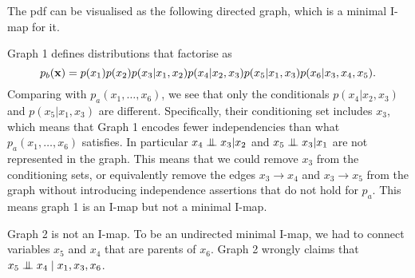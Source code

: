   \begin{solution}
    The pdf can be visualised as the following directed graph, which is a minimal I-map for it.\\
    \begin{center}
    \end{center}
    Graph 1 defines distributions that factorise as
    \begin{equation}
      p_b(\mathbf{x}) = p(x_1) p(x_2) p(x_3|x_1, x_2) p(x_4|x_2, x_3) p(x_5|x_1, x_3) p(x_6|x_3,x_4,x_5).
    \end{equation}
    Comparing with $p_a(x_1, \ldots, x_6)$, we see that only the
    conditionals $p(x_4|x_2, x_3)$ and $p(x_5|x_1, x_3)$ are
    different. Specifically, their conditioning set includes $x_3$,
    which means that Graph 1 encodes fewer independencies than what
    $p_a(x_1, \ldots, x_6)$ satisfies. In particular $x_4 \mathrel{\perp\mspace{-10mu}\perp}
    x_3 | x_2$ and $x_5 \mathrel{\perp\mspace{-10mu}\perp} x_3 | x_1$ are not represented in
    the graph. This means that we could remove $x_3$ from the
    conditioning sets, or equivalently remove the edges $x_3
    \rightarrow x_4$ and $x_3 \rightarrow x_5$ from the graph without
    introducing independence assertions that do not hold for
    $p_a$. This means graph 1 is an I-map but not a minimal I-map.
    
    Graph 2 is not an I-map. To be an undirected minimal I-map, we had
    to connect variables $x_5$ and $x_4$ that are parents of
    $x_6$. Graph 2 wrongly claims that $x_5 \mathrel{\perp\mspace{-10mu}\perp} x_4 \mid
    x_1,x_3,x_6$.
    
  \end{solution}


  


